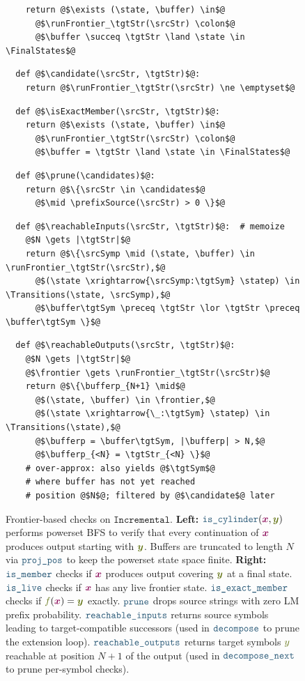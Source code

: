 \documentclass{article}
\theoremstyle{plain}
\newcommand{\mymacro}[1]{#1}
\newcommand{\transFnSym}[0]{f}
\newcommand{\transFn}{\ensuremath{{\color{CharacterColor}\transFnSym}}\xspace}
\newcommand{\srcSymp}{{\color{TokenColor}x^\prime}}
\newcommand{\srcStr}{\ensuremath{{\color{TokenColor}\boldsymbol{x}}}\xspace}
\newcommand{\tgtSym}{{\color{CharacterColor}y}}
\newcommand{\tgtStr}{{\color{CharacterColor}\boldsymbol{y}}}
\newcommand{\pSource}{\mymacro{p_{\srcAlphabet}}}
\newcommand{\prefixLanguageOp}[1]{\overrightarrow{#1}}
\newcommand{\prefixSource}{{\mymacro{\prefixLanguageOp{\pSource}}}}
\newcommand{\srcAlphabet}[0]{{\color{TokenColor}\ensuremath{\mathcal{X}}}\xspace}
\newcommand{\Transitions}{\mymacro{\mathsf{T}}}
\newcommand{\FinalStates}{\mymacro{\mathsf{F}}}
\newcommand{\state}{\mymacro{s}}
\newcommand{\statep}{\mymacro{s^\prime}}
\newcommand{\candidates}[0]{\texttt{C}}
\newcommand{\frontier}{\mathcal{F}}
\newcommand{\buffer}{{\color{CharacterColor}\boldsymbol{b}}}
\newcommand{\bufferp}{{\color{CharacterColor}\boldsymbol{b}'}}
\newcommand{\myMintedFunc}[1]{\mbox{\texttt{{\color{StormBlue}#1}}}}
\newcommand{\continuous}[0]{\myMintedFunc{is\_cylinder}}
\newcommand{\discontinuous}[0]{\myMintedFunc{is\_member}}
\newcommand{\candidate}[0]{\myMintedFunc{is\_live}}
\newcommand{\prune}[0]{\myMintedFunc{prune}}
\newcommand{\decompose}[0]{\myMintedFunc{decompose}}
\newcommand{\runFrontier}[0]{\myMintedFunc{run}}
\newcommand{\reachableOutputs}[0]{\myMintedFunc{reachable\_outputs}}
\newcommand{\reachableInputs}[0]{\myMintedFunc{reachable\_inputs}}
\newcommand{\isExactMember}[0]{\myMintedFunc{is\_exact\_member}}
\newcommand{\decomposeNext}[0]{\myMintedFunc{decompose\_next}}
\newcommand{\projUniv}[0]{\myMintedFunc{proj\_pos}}
\begin{document}
\begin{figure}[H]
\begin{minipage}[t]{.38\linewidth}
\begin{verbatim}
    return @$\exists (\state, \buffer) \in$@
      @$\runFrontier_\tgtStr(\srcStr) \colon$@
      @$\buffer \succeq \tgtStr \land \state \in \FinalStates$@
\end{verbatim}
\begin{verbatim}
  def @$\candidate(\srcStr, \tgtStr)$@:
    return @$\runFrontier_\tgtStr(\srcStr) \ne \emptyset$@
\end{verbatim}
\begin{verbatim}
  def @$\isExactMember(\srcStr, \tgtStr)$@:
    return @$\exists (\state, \buffer) \in$@
      @$\runFrontier_\tgtStr(\srcStr) \colon$@
      @$\buffer = \tgtStr \land \state \in \FinalStates$@
\end{verbatim}
\begin{verbatim}
  def @$\prune(\candidates)$@:
    return @$\{\srcStr \in \candidates$@
      @$\mid \prefixSource(\srcStr) > 0 \}$@
\end{verbatim}
\begin{verbatim}
  def @$\reachableInputs(\srcStr, \tgtStr)$@:  # memoize
    @$N \gets |\tgtStr|$@
    return @$\{\srcSymp \mid (\state, \buffer) \in \runFrontier_\tgtStr(\srcStr),$@
      @$(\state \xrightarrow{\srcSymp:\tgtSym} \statep) \in \Transitions(\state, \srcSymp),$@
      @$\buffer\tgtSym \preceq \tgtStr \lor \tgtStr \preceq \buffer\tgtSym \}$@
\end{verbatim}
\begin{verbatim}
  def @$\reachableOutputs(\srcStr, \tgtStr)$@:
    @$N \gets |\tgtStr|$@
    @$\frontier \gets \runFrontier_\tgtStr(\srcStr)$@
    return @$\{\bufferp_{N+1} \mid$@
      @$(\state, \buffer) \in \frontier,$@
      @$(\state \xrightarrow{\_:\tgtSym} \statep) \in \Transitions(\state),$@
      @$\bufferp = \buffer\tgtSym, |\bufferp| > N,$@
      @$\bufferp_{<N} = \tgtStr_{<N} \}$@
    # over-approx: also yields @$\tgtSym$@
    # where buffer has not yet reached
    # position @$N$@; filtered by @$\candidate$@ later
\end{verbatim}
\end{minipage}
\caption{Frontier-based checks on $\texttt{Incremental}$.
\textbf{Left:} $\continuous(\srcStr, \tgtStr)$ performs powerset BFS to verify
that every continuation of $\srcStr$ produces output starting with $\tgtStr$.
Buffers are truncated to length $N$ via $\projUniv$ to keep the powerset
state space finite.
\textbf{Right:}
$\discontinuous$ checks if $\srcStr$ produces output covering $\tgtStr$ at a
final state.
$\candidate$ checks if $\srcStr$ has any live frontier state.
$\isExactMember$ checks if $\transFn(\srcStr) = \tgtStr$ exactly.
$\prune$ drops source strings with zero LM prefix probability.
$\reachableInputs$ returns source symbols leading to target-compatible
successors (used in $\decompose$ to prune the extension loop).
$\reachableOutputs$ returns target symbols $\tgtSym$ reachable at position
$N{+}1$ of the output (used in $\decomposeNext$ to prune per-symbol checks).}
\label{fig:checks}
\end{figure}
\end{document}

